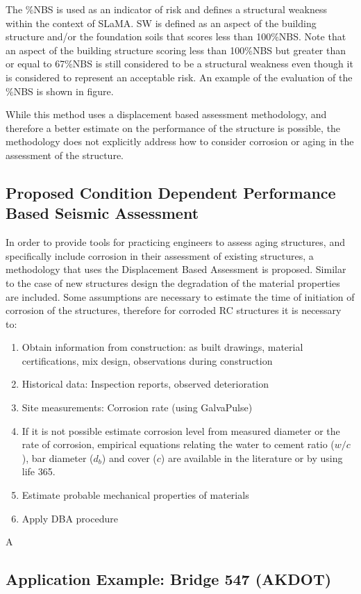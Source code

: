 The \%NBS is used as an indicator of risk and defines a structural weakness within the context of SLaMA. SW is defined as an aspect of the building structure and/or the foundation soils that scores less than 100\%NBS. Note that an aspect of the building structure scoring less than 100\%NBS but greater than or equal to 67\%NBS is still considered to be a structural weakness even though it is considered to represent an acceptable risk. An example of the evaluation of the \%NBS is shown in figure.

While this method uses a displacement based assessment methodology, and therefore a better estimate on the performance of the structure is possible, the methodology does not explicitly address how to consider corrosion or aging in the assessment of the structure.

\subsection{Proposed Condition Dependent Performance Based Seismic Assessment}

In order to provide tools for practicing engineers to assess aging structures, and specifically include corrosion in their assessment of existing structures, a methodology that uses the Displacement Based Assessment is proposed. Similar to the case of new structures design the degradation of the material properties are included. Some assumptions are necessary to estimate the time of initiation of corrosion of the structures, therefore for corroded RC structures it is necessary to:

\begin{enumerate}
    \item Obtain information from construction: as built drawings, material certifications, mix design, observations during construction
    \item Historical data: Inspection reports, observed deterioration
    \item Site measurements: Corrosion rate (using GalvaPulse)
    \item If it is not possible estimate corrosion level from measured diameter or the rate of corrosion, empirical equations relating the water to cement ratio ($w/c$), bar diameter ($d_{b}$) and cover ($c$) are available in the literature or by using life 365.
    \item Estimate probable mechanical properties of materials
    \item Apply DBA procedure
\end{enumerate}

A 

\subsection{Application Example: Bridge 547 (AKDOT)}
